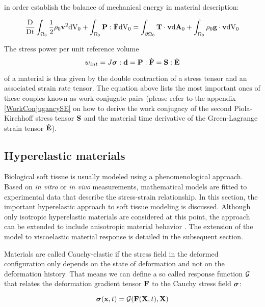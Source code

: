 in order establish the balance of mechanical energy in material description:

 \begin{equation}
    \frac{\textnormal{D}}{\textnormal{Dt}} \int_{ \Omega _0} \frac{1}{2}  \rho_0  \mathbf {v} ^2  \textnormal{dV}_0 +   \int_{ \Omega_0} \mathbf {P}  : \dot{\mathbf {F }}    \textnormal{dV}_0     =  \int_{ \partial \Omega_0} \mathbf {T}  \cdot \mathbf {v}    \textnormal{d}\mathbf{A}_0 +  \int_{ \Omega_0} \rho_0 \mathbf {g}  \cdot \mathbf {v}   \textnormal{dV}_0 
\label{MechEnergyBalanceMaterial}
\end{equation}


The stress power per unit reference volume 
 \begin{equation}
w_{int}     =   J \boldsymbol{\sigma} : \mathbf {d}    =  \mathbf {P}  : \dot{\mathbf {F }}    = \mathbf {S}  : \dot{\mathbf {E} }  
\label{WorkConjugancy}
\end{equation}

of a material is thus given by the double contraction of a stress tensor and an associated strain rate tensor. The equation above lists the most important ones of these couples known as work conjugate pairs (please refer to the appendix \ref{WorkConjugancySE} on how to derive the work conjugacy of the second Piola-Kirchhoff stress tensor $\mathbf {S} $ and the material time derivative of the Green-Lagrange strain tensor $\dot{\mathbf {E} }$). 


\subsection{Hyperelastic materials}

Biological soft tissue is usually modeled using a phenomenological approach. Based on \emph{in vitro} or \emph{in vivo} measurements, mathematical models are fitted to experimental data that describe the stress-strain relationship. In this section, the important hyperelastic approach to soft tissue modeling is discussed. Although only isotropic hyperelastic materials are considered at this point, the approach can be extended to include anisotropic material behavior \cite{Holzapfel2001}. The extension of the model to viscoelastic material response is detailed in the subsequent section.

Materials are called Cauchy-elastic if the stress field in the deformed configuration only depends on the state of deformation and not on the deformation history. That means we can define a so called response function $\mathcal G $ that relates the deformation gradient tensor $\mathbf {F }$ to the Cauchy stress field $\boldsymbol{\sigma}$:

 \begin{equation}
\boldsymbol{\sigma}(\mathbf {x} , t) = \mathcal G  (\mathbf {F }(\mathbf {X} ,t),\mathbf {X} )  
\end{equation}

